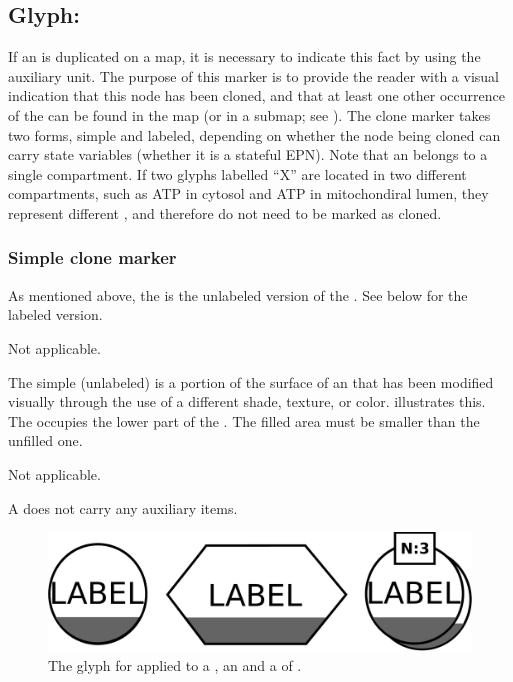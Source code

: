 
\subsection{Glyph: }
\label{sec:cloneMarker}

If an  is duplicated on a map, it is necessary to indicate this fact by using the  auxiliary unit.  The purpose of this marker is to provide the reader with a visual indication that this node has been cloned, and that at least one other occurrence of the  can be found in the map (or in a submap; see ).  The clone marker takes two forms, simple and labeled, depending on whether the node being cloned can carry state variables (\ie whether it is a stateful EPN). Note that an  belongs to a single compartment. If two glyphs labelled ``X'' are located in two different compartments, such as ATP in cytosol and ATP in mitochondiral lumen, they represent different , and therefore do not need to be marked as cloned.


\subsubsection{Simple clone marker}

As mentioned above, the  is the unlabeled version of the .  See below for the labeled version.


\begin{glyphDescription}

\glyphSboTerm Not applicable.

\glyphContainer The simple (unlabeled)  is a portion of the surface of an  that has been modified visually through the use of a different shade, texture, or color.   illustrates this.  The  occupies the lower part of the . The filled area must be smaller than the unfilled one.

\glyphLabel Not applicable.

\glyphAux A  does not carry any auxiliary items.

\end{glyphDescription}

\begin{figure}[H]
  \centering
  \includegraphics[scale = 0.3]{images/simpleCloneMarker}
  \caption{The \PD glyph for  applied to a , an  and a  of .}
  \label{fig:simpleCloneMarker}
\end{figure}


